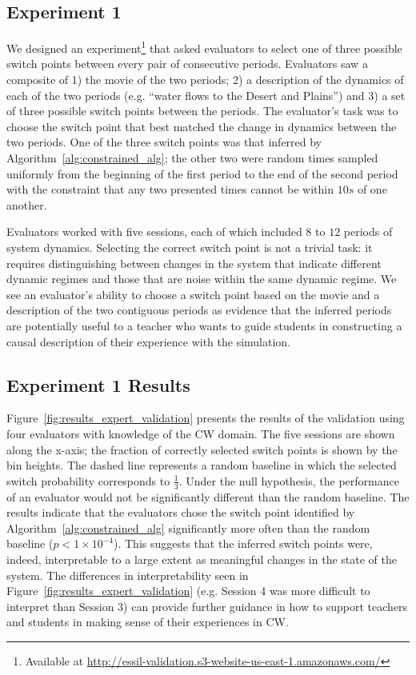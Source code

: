 \subsection{Experiment 1}\label{sec:experiment1-empirical-validation}

We designed an experiment\footnote{Available at \url{http://essil-validation.s3-website-us-east-1.amazonaws.com/}} that asked evaluators to select one of three possible switch points between every pair of consecutive periods. Evaluators saw a composite of 1) the movie of the two periods; 2) a description of the dynamics of each of the two periods (e.g. ``water flows to the Desert and Plains'') and 3) a set of three possible switch points between the periods. The evaluator's task was to choose the switch point that best matched the change in dynamics between the two periods. One of the three switch points was that inferred by Algorithm~\ref{alg:constrained_alg}; the other two were random times sampled uniformly from the beginning of the first period to the end of the second period with the constraint that any two presented times cannot be within $10s$ of one another.

Evaluators worked with five sessions, each of which included $8$ to $12$ periods of system dynamics. Selecting the correct switch point is not a trivial task: it requires distinguishing between changes in the system that indicate different dynamic regimes and those that are noise within the same dynamic regime. We see an evaluator's ability to choose a switch point based on the movie and a description of the two contiguous periods as evidence that the inferred periods are potentially useful to a teacher who wants to guide students in constructing a causal description of their experience with the simulation.

\subsection{Experiment 1 Results}\label{sec:experiment1-empirical-validation-results}

Figure~\ref{fig:results_expert_validation} presents the results of the validation using four evaluators with knowledge of the CW domain. The five sessions are shown along the x-axis; the fraction of correctly selected switch points is shown by the bin heights. The dashed line represents a random baseline in which the selected switch probability corresponds to $\frac{1}{3}$. Under the null hypothesis, the performance of an evaluator would not be significantly different than the random baseline. The results indicate that the evaluators chose the switch point identified by Algorithm~\ref{alg:constrained_alg} significantly more often than the random baseline ($p < 1\times 10^{-4}$). This suggests that the inferred switch points were, indeed, interpretable to a large extent as meaningful changes in the state of the system. The differences in interpretability seen in Figure~\ref{fig:results_expert_validation} (e.g. Session 4 was more difficult to interpret than Session 3) can provide further guidance in how to support teachers and students in making sense of their experiences in CW.

